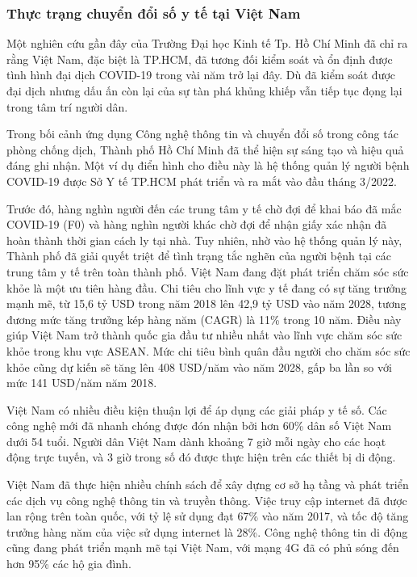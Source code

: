 \subsubsection{Thực trạng chuyển đổi số y tế tại Việt Nam}
Một nghiên cứu gần đây của Trường Đại học Kinh tế Tp. Hồ Chí Minh đã chỉ ra rằng Việt Nam, đặc biệt là TP.HCM, đã tương đối kiểm soát và ổn định được tình hình đại dịch COVID-19 trong vài năm trở lại đây. Dù đã kiểm soát được đại dịch nhưng dấu ấn còn lại của sự tàn phá khủng khiếp vẫn tiếp tục đọng lại trong tâm trí người dân.

Trong bối cảnh ứng dụng Công nghệ thông tin và chuyển đổi số trong công tác phòng chống dịch, Thành phố Hồ Chí Minh đã thể hiện sự sáng tạo và hiệu quả đáng ghi nhận. Một ví dụ điển hình cho điều này là hệ thống quản lý người bệnh COVID-19 được Sở Y tế TP.HCM phát triển và ra mắt vào đầu tháng 3/2022.

Trước đó, hàng nghìn người đến các trung tâm y tế chờ đợi để khai báo đã mắc COVID-19 (F0) và hàng nghìn người khác chờ đợi để nhận giấy xác nhận đã hoàn thành thời gian cách ly tại nhà. Tuy nhiên, nhờ vào hệ thống quản lý này, Thành phố đã giải quyết triệt để tình trạng tắc nghẽn của người bệnh tại các trung tâm y tế trên toàn thành phố.
Việt Nam đang đặt phát triển chăm sóc sức khỏe là một ưu tiên hàng đầu. Chi tiêu cho lĩnh vực y tế đang có sự tăng trưởng mạnh mẽ, từ 15,6 tỷ USD trong năm 2018 lên 42,9 tỷ USD vào năm 2028, tương đương mức tăng trưởng kép hàng năm (CAGR) là 11\% trong 10 năm. Điều này giúp Việt Nam trở thành quốc gia đầu tư nhiều nhất vào lĩnh vực chăm sóc sức khỏe trong khu vực ASEAN. Mức chi tiêu bình quân đầu người cho chăm sóc sức khỏe cũng dự kiến sẽ tăng lên 408 USD/năm vào năm 2028, gấp ba lần so với mức 141 USD/năm năm 2018.

Việt Nam có nhiều điều kiện thuận lợi để áp dụng các giải pháp y tế số. Các công nghệ mới đã nhanh chóng được đón nhận bởi hơn 60\% dân số Việt Nam dưới 54 tuổi. Người dân Việt Nam dành khoảng 7 giờ mỗi ngày cho các hoạt động trực tuyến, và 3 giờ trong số đó được thực hiện trên các thiết bị di động.

Việt Nam đã thực hiện nhiều chính sách để xây dựng cơ sở hạ tầng và phát triển các dịch vụ công nghệ thông tin và truyền thông. Việc truy cập internet đã được lan rộng trên toàn quốc, với tỷ lệ sử dụng đạt 67\% vào năm 2017, và tốc độ tăng trưởng hàng năm của việc sử dụng internet là 28\%. Công nghệ thông tin di động cũng đang phát triển mạnh mẽ tại Việt Nam, với mạng 4G đã có phủ sóng đến hơn 95\% các hộ gia đình.

